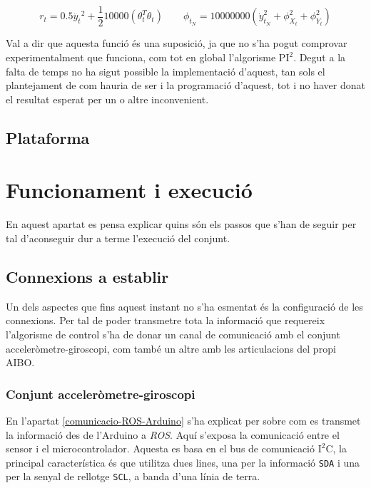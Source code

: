 \documentclass[12pt,a4paper,final,twoside]{report}
\begin{document}
\begin{equation}\label{eq:funcio-objectiu-PI2}
r_t = 0.5\ddot{y_t}^2 + \frac{1}{2}10000( \theta_t^T \theta_t)    \qquad {}  \phi_{t_N} = 10000000(\dot{y}_{t_N}^2 + \phi_{X_t}^2 + \phi_{Y_t}^2) 
\end{equation}

Val a dir que aquesta funció és una suposició, ja que no s'ha pogut comprovar experimentalment que funciona, com tot en global l'algorisme $\mathrm{PI^2}$. Degut a la falta de temps no ha sigut possible la implementació d'aquest, tan sols el plantejament de com hauria de ser i la programació d'aquest, tot i no haver donat el resultat esperat per un o altre inconvenient.

\section{Plataforma}

\chapter{Funcionament i execució}

En aquest apartat es pensa explicar quins són els passos que s'han de seguir per tal d'aconseguir dur a terme l'execució del conjunt.

\section{Connexions a establir}

Un dels aspectes que fins aquest instant no s'ha esmentat és la configuració de les connexions. Per tal de poder transmetre tota la informació que requereix l'algorisme de control s'ha de donar un canal de comunicació amb el conjunt acceleròmetre-giroscopi, com també un altre amb les articulacions del propi AIBO.

\subsection{Conjunt acceleròmetre-giroscopi}

En l'apartat \ref{comunicacio-ROS-Arduino} s'ha explicat per sobre com es transmet la informació des de l'Arduino a \textit{ROS}. Aquí s'exposa la comunicació entre el sensor i el microcontrolador. Aquesta es basa en el bus de comunicació $\mathrm{I^2C}$, la principal característica és que utilitza dues lines, una per la informació \texttt{SDA} i una per la senyal de rellotge \texttt{SCL}, a banda d'una línia de terra. 
\end{document}
